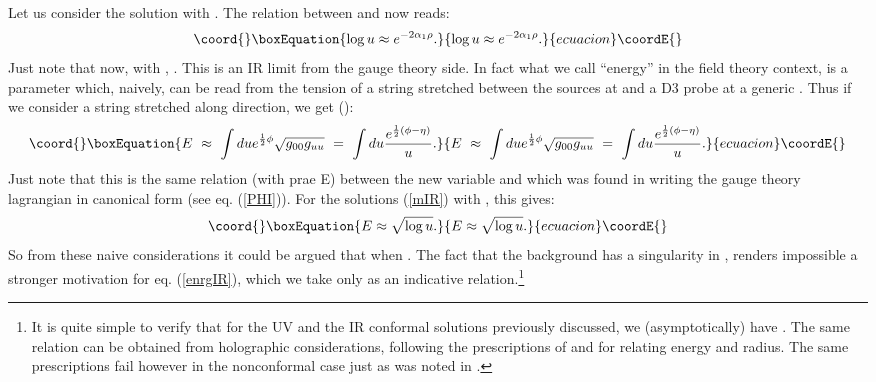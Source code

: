 \documentclass[a4paper,12pt]{article}
\def\half{{1 \over 2}}
\begin{document}
Let us consider the solution with \coordHE{}. The 
relation between  \myHighlight{$\rho$}\coordHE{} and \coordHE{} now reads:
\begin{equation}\coord{}\boxEquation{
{\log u}\approx e^{-2\alpha_1\rho}.
}{
{\log u}\approx e^{-2\alpha_1\rho}.
}{ecuacion}\coordE{}\end{equation}
Just note that now, with \myHighlight{$\rho\rightarrow\infty$}\coordHE{}, \coordHE{}. This is 
 an IR limit from the gauge theory side. In fact what we call ``energy'' 
 \coordHE{} in the field theory context, is a parameter which, naively, can be read from the 
tension of a string stretched between the sources at \coordHE{} and a D3 probe at a 
generic \coordHE{} \cite{malda0}. Thus if we consider a string stretched along \coordHE{} direction,
we get (\coordHE{}):
\begin{equation}\coord{}\boxEquation{
E~\approx~\int du e^{\half\phi}\sqrt{g_{00}g_{uu}}~=~\int du {e^{\half (\phi - \eta)}\over u}.
}{
E~\approx~\int du e^{\half\phi}\sqrt{g_{00}g_{uu}}~=~\int du {e^{\half (\phi - \eta)}\over u}.
}{ecuacion}\coordE{}\end{equation}
Just note that this is the same relation (with \myHighlight{$\Phi$}\coordHE{} prae E) between the new variable and \coordHE{} which was found in writing the gauge theory lagrangian in canonical form (see eq. (\ref{PHI})).
For the solutions (\ref{mIR}) with \coordHE{}, this gives:
\begin{equation}\coord{}\boxEquation{
E\approx \sqrt{\log u}.
\label{enrgIR}
}{
E\approx \sqrt{\log u}.
}{ecuacion}\coordE{}\end{equation}
So from these naive considerations it  could be  argued that \coordHE{} 
when \coordHE{}. The fact that the background has a singularity in \coordHE{} 
\cite{minahan}, renders impossible a stronger motivation for eq. (\ref{enrgIR}), 
which we take only as an indicative relation.\footnote{It is quite simple to verify that for the UV and  the IR conformal solutions 
previously discussed, we (asymptotically) have  \coordHE{}. The same relation can
be obtained from holographic considerations, following the prescriptions of \cite{sw} and
\cite{pepo} for relating energy and radius. The same prescriptions fail however in the nonconformal case just as was noted in \cite{pepo}.} 
\end{document}
